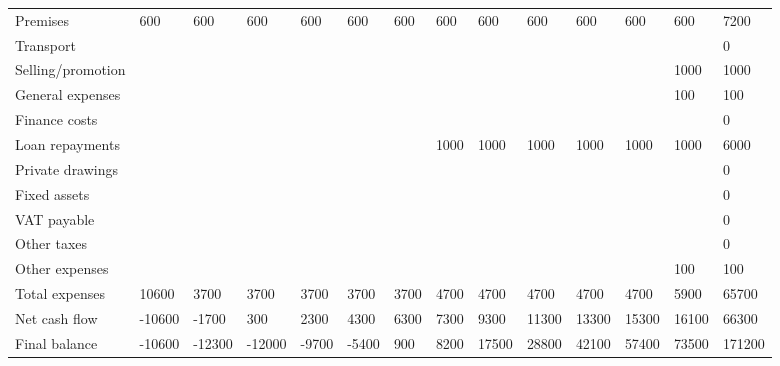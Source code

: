 \documentclass{article}
\begin{document}
\begin{landscape}
\begin{table}[H]
\begin{tabular}{llllllllllllll}
Premises           & 600     & 600     & 600     & 600     & 600     & 600     & 600     & 600     & 600     & 600      & 600      & 600      & 7200      \\
Transport          &         &         &         &         &         &         &         &         &         &          &          &          & 0         \\
Selling/promotion  &         &         &         &         &         &         &         &         &         &          &          & 1000     & 1000      \\
General expenses   &         &         &         &         &         &         &         &         &         &          &          & 100      & 100       \\
Finance costs      &         &         &         &         &         &         &         &         &         &          &          &          & 0         \\
Loan repayments    &         &         &         &         &         &         & 1000    & 1000    & 1000    & 1000     & 1000     & 1000     & 6000      \\
Private drawings   &         &         &         &         &         &         &         &         &         &          &          &          & 0         \\
Fixed assets       &         &         &         &         &         &         &         &         &         &          &          &          & 0         \\
VAT payable        &         &         &         &         &         &         &         &         &         &          &          &          & 0         \\
Other taxes        &         &         &         &         &         &         &         &         &         &          &          &          & 0         \\
Other expenses     &         &         &         &         &         &         &         &         &         &          &          & 100      & 100       \\
Total expenses     & 10600   & 3700    & 3700    & 3700    & 3700    & 3700    & 4700    & 4700    & 4700    & 4700     & 4700     & 5900     & 65700     \\
Net cash flow      & -10600  & -1700   & 300     & 2300    & 4300    & 6300    & 7300    & 9300    & 11300   & 13300    & 15300    & 16100    & 66300     \\
Final balance      & -10600  & -12300  & -12000  & -9700   & -5400   & 900     & 8200    & 17500   & 28800   & 42100    & 57400    & 73500    & 171200   
\end{tabular}
\end{table}





\end{landscape}
\pagebreak
\end{document}
